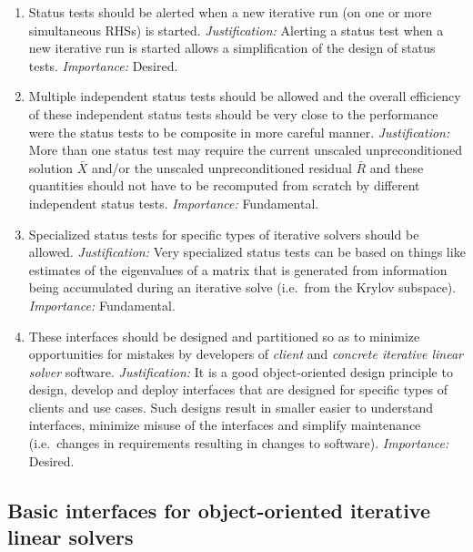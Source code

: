 \documentclass[pdf,ps2pdf,11pt]{SANDreport}
\begin{document}
\begin{enumerate}
\item

Status tests should be alerted when a new iterative run (on one or
more simultaneous RHSs) is started.  {}\textit{Justification:}
Alerting a status test when a new iterative run is started allows a
simplification of the design of status tests.  {}\textit{Importance:}
Desired.

\item

Multiple independent status tests should be allowed and the overall
efficiency of these independent status tests should be very close to
the performance were the status tests to be composite in more careful
manner.  {}\textit{Justification:} More than one status test may
require the current unscaled unpreconditioned solution $\bar{X}$
and/or the unscaled unpreconditioned residual $\bar{R}$ and these
quantities should not have to be recomputed from scratch by different
independent status tests.  {}\textit{Importance:} Fundamental.

\item

Specialized status tests for specific types of iterative solvers
should be allowed.  {}\textit{Justification:} Very specialized status
tests can be based on things like estimates of the eigenvalues of a
matrix that is generated from information being accumulated during an
iterative solve (i.e.~from the Krylov subspace).  {}\textit{Importance:} Fundamental.

\item

These interfaces should be designed and partitioned so as to minimize
opportunities for mistakes by developers of {}\textit{client} and
{}\textit{concrete iterative linear solver} software.
{}\textit{Justification:} It is a good object-oriented design
principle to design, develop and deploy interfaces that are designed
for specific types of clients and use cases.  Such designs result in
smaller easier to understand interfaces, minimize misuse of the
interfaces and simplify maintenance (i.e.~changes in requirements
resulting in changes to software).  {}\textit{Importance:} Desired.

\end{enumerate}

\subsection{Basic interfaces for object-oriented iterative linear solvers}
\end{document}
